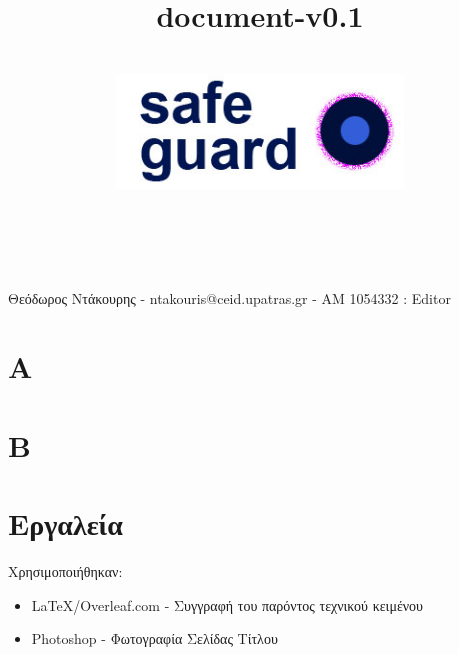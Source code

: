\documentclass{article}
\title{document-v0.1}
\author{\\
\includegraphics[width=3in]{safeguard}\\[1ex]\\\\
}
\begin{document}
\maketitle

Θεόδωρος Ντάκουρης - ntakouris@ceid.upatras.gr - ΑΜ 1054332 : Editor

\newpage
\renewcommand{\contentsname}{Περιεχόμενα}
\tableofcontents


\section{A}

\section{B}

\section{Εργαλεία}
Χρησιμοποιήθηκαν:
\begin{itemize}
    \item \LaTeX/Overleaf.com - Συγγραφή του παρόντος τεχνικού κειμένου
    \item Photoshop - Φωτογραφία Σελίδας Τίτλου
    
\end{itemize}
\end{document}
